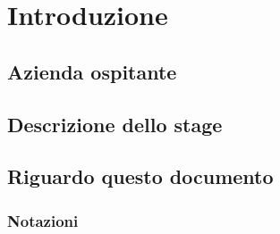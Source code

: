 \chapter{Introduzione}\label{ch:introduzione}

\section{Azienda ospitante}

\section{Descrizione dello stage}

\section{Riguardo questo documento}
\subsection{Notazioni}